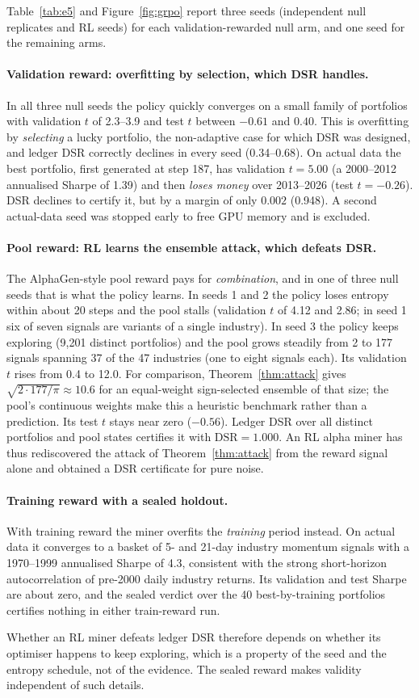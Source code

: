 Table~\ref{tab:e5} and Figure~\ref{fig:grpo} report three seeds (independent null replicates and RL seeds) for each validation-rewarded null arm, and one seed for the remaining arms.

\paragraph{Validation reward: overfitting by selection, which DSR handles.} In all three null seeds the policy quickly converges on a small family of portfolios with validation $t$ of 2.3--3.9 and test $t$ between $-0.61$ and $0.40$. This is overfitting by \emph{selecting} a lucky portfolio, the non-adaptive case for which DSR was designed, and ledger DSR correctly declines in every seed (0.34--0.68). On actual data the best portfolio, first generated at step 187, has validation $t=5.00$ (a 2000--2012 annualised Sharpe of 1.39) and then \emph{loses money} over 2013--2026 (test $t=-0.26$). DSR declines to certify it, but by a margin of only $0.002$ (0.948). A second actual-data seed was stopped early to free GPU memory and is excluded.

\paragraph{Pool reward: RL learns the ensemble attack, which defeats DSR.} The AlphaGen-style pool reward pays for \emph{combination}, and in one of three null seeds that is what the policy learns. In seeds 1 and 2 the policy loses entropy within about 20 steps and the pool stalls (validation $t$ of 4.12 and 2.86; in seed 1 six of seven signals are variants of a single industry). In seed 3 the policy keeps exploring (9{,}201 distinct portfolios) and the pool grows steadily from 2 to 177 signals spanning 37 of the 47 industries (one to eight signals each). Its validation $t$ rises from 0.4 to 12.0. For comparison, Theorem~\ref{thm:attack} gives $\sqrt{2\cdot177/\pi}\approx10.6$ for an equal-weight sign-selected ensemble of that size; the pool's continuous weights make this a heuristic benchmark rather than a prediction. Its test $t$ stays near zero ($-0.56$). Ledger DSR over all distinct portfolios and pool states certifies it with $\mathrm{DSR}=1.000$. An RL alpha miner has thus rediscovered the attack of Theorem~\ref{thm:attack} from the reward signal alone and obtained a DSR certificate for pure noise.

\paragraph{Training reward with a sealed holdout.} With training reward the miner overfits the \emph{training} period instead. On actual data it converges to a basket of 5- and 21-day industry momentum signals with a 1970--1999 annualised Sharpe of 4.3, consistent with the strong short-horizon autocorrelation of pre-2000 daily industry returns. Its validation and test Sharpe are about zero, and the sealed verdict over the 40 best-by-training portfolios certifies nothing in either train-reward run.

Whether an RL miner defeats ledger DSR therefore depends on whether its optimiser happens to keep exploring, which is a property of the seed and the entropy schedule, not of the evidence. The sealed reward makes validity independent of such details.
